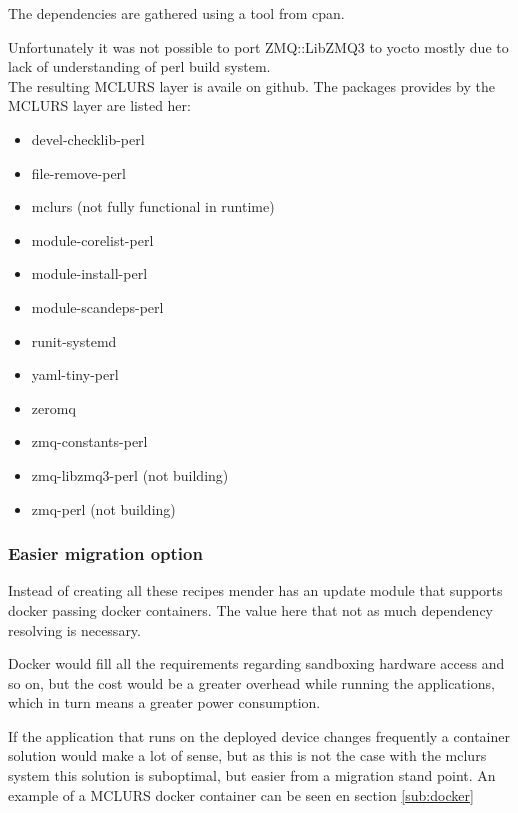 \documentclass[../../main.tex]{subfiles}
\begin{document}
The dependencies are gathered using a tool from cpan\cite{perl-deps}.

Unfortunately it was not possible to port
ZMQ::LibZMQ3\cite{zmq-libzmq3} to yocto mostly due to lack
of understanding of perl build system.\\

The resulting MCLURS layer is availe on github\cite{meta-mclurs}.
The packages provides by the MCLURS layer are listed her:
\begin{itemize}
	\item devel-checklib-perl
	\item file-remove-perl
	\item mclurs (not fully functional in runtime)
	\item module-corelist-perl
	\item module-install-perl
	\item module-scandeps-perl
	\item runit-systemd
	\item yaml-tiny-perl
	\item zeromq
	\item zmq-constants-perl
	\item zmq-libzmq3-perl (not building)
	\item	zmq-perl (not building)
\end{itemize}





\subsubsection{Easier migration option}%
\label{ssub:easier_migration_option}

Instead of creating all these recipes mender has an update module that supports docker
passing docker containers. The value here that not as much dependency resolving is necessary.

Docker would fill all the requirements regarding sandboxing hardware access and so on,
but the cost would be a greater overhead while running the applications, which in turn
means a greater power consumption.

If the application that runs on the deployed device changes frequently a container solution
would make a lot of sense, but as this is not the case with the mclurs system this solution
is suboptimal, but easier from a migration stand point.
An example of a MCLURS docker container can be seen en section \ref{sub:docker}
\end{document}
